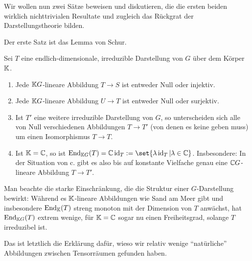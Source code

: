 \begin{remark}
Wir wollen nun zwei Sätze beweisen und diskutieren, die die ersten beiden wirklich nichttrivialen Resultate und zugleich das Rückgrat der Darstellungstheorie bilden.

Der erste Satz ist das Lemma von Schur.
\end{remark}

\begin{theorem}
Sei $T$ eine endlich-dimensionale, irreduzible Darstellung von $G$ über dem Körper $\mathbb{K}$.
\begin{enumerate}
\item Jede $\mathbb{K} G$-lineare Abbildung $T\to S$ ist entweder Null oder injektiv.
\item Jede $\mathbb{K} G$-lineare Abbildung $U\to T$ ist entweder Null oder surjektiv.
\item Ist $T'$ eine weitere irreduzible Darstellung von $G$, so unterscheiden sich alle von Null verschiedenen Abbildungen $T\to T'$ (von denen es keine geben muss) um einen Isomorphismus $T\to T$.
\item Ist $\mathbb{K}=\mathbb{C}$, so ist $\End_{\IK G}(T) = \IC\id_T := \set{\lambda\id_T | \lambda\in\IC}$. Insbesondere: In der Situation von c. gibt es also bis auf konstante Vielfache genau eine $\mathbb{C} G$-lineare Abbildung $T\to T'$.
\end{enumerate}
\end{theorem}

\begin{remark}
Man beachte die starke Einschränkung, die die Struktur einer $G$-Darstellung bewirkt: Während es $\mathbb{K}$-lineare Abbildungen wie Sand am Meer gibt und insbesondere $\operatorname{End}_{\mathbb{K}}(T)$ streng monoton mit der Dimension von $T$ anwächst, hat $\operatorname{End}_{\mathbb{K} G}(T)$ extrem wenige, für $\mathbb{K}=\mathbb{C}$ sogar nu einen Freiheitsgrad, solange $T$ irreduzibel ist.

Das ist letztlich die Erklärung dafür, wieso wir relativ wenige \enquote{natürliche} Abbildungen zwischen Tensorräumen gefunden haben.
\end{remark}

